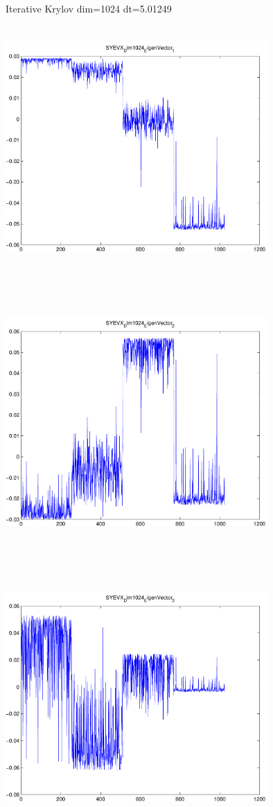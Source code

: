 \documentclass[9pt]{article}
\theoremstyle{plain}
\theoremstyle{definition}
\theoremstyle{remark}
\numberwithin{equation}{section}
\begin{document}
Iterative Krylov dim=1024 dt=5.01249
\includegraphics[width=10.0cm,height=10.0cm]{SYEVX_Dim1024_EigenVector_1.pdf}

\includegraphics[width=10.0cm,height=10.0cm]{SYEVX_Dim1024_EigenVector_2.pdf}

\includegraphics[width=10.0cm,height=10.0cm]{SYEVX_Dim1024_EigenVector_3.pdf}
\end{document}
